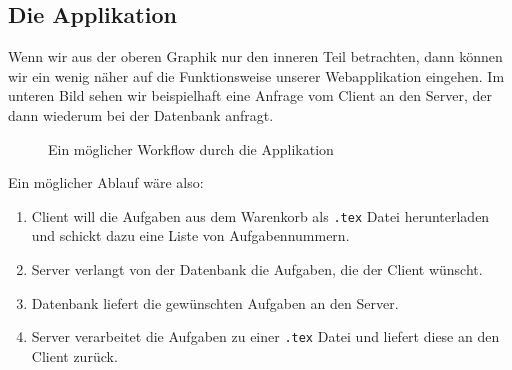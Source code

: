 \subsection{Die Applikation}

Wenn wir aus der oberen Graphik nur den inneren Teil betrachten, dann können wir ein wenig näher auf die Funktionsweise unserer Webapplikation eingehen. Im unteren Bild sehen wir beispielhaft eine Anfrage vom Client an den Server, der dann wiederum bei der Datenbank anfragt.

\begin{figure}
    \caption{Ein möglicher Workflow durch die Applikation \cite{fig:workflow}}
\end{figure}
Ein möglicher Ablauf wäre also:
\begin{enumerate}
    \item Client will die Aufgaben aus dem Warenkorb als \verb|.tex| Datei herunterladen und schickt dazu eine Liste von Aufgabennummern.
    \item Server verlangt von der Datenbank die Aufgaben, die der Client wünscht.
    \item Datenbank liefert die gewünschten Aufgaben an den Server.
    \item Server verarbeitet die Aufgaben zu einer \verb|.tex| Datei und liefert diese an den Client zurück.
\end{enumerate}